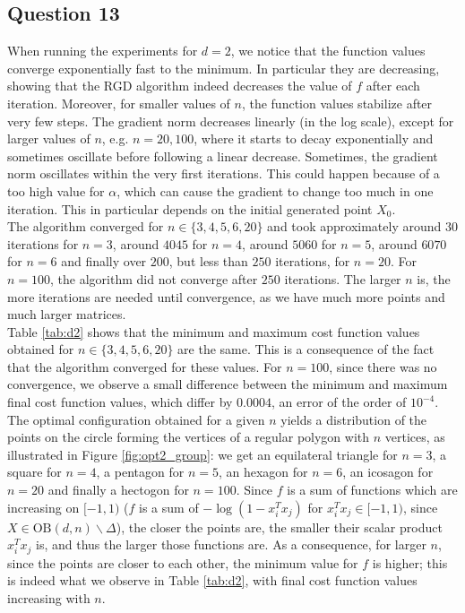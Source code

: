\documentclass{article}
\begin{document}
\subsection*{Question 13}
When running the experiments for $d=2$, we notice that the function values converge exponentially fast to the minimum. In particular they are decreasing, showing that the RGD algorithm indeed decreases the value of $f$ after each iteration. Moreover, for smaller values of $n$, the function values stabilize after very few steps. The gradient norm decreases linearly (in the log scale), except for larger values of $n$, e.g. $n=20, 100$, where it starts to decay exponentially and sometimes oscillate before following a linear decrease. Sometimes, the gradient norm oscillates within the very first iterations. This could happen because of a too high value for $\alpha$, which can cause the gradient to change too much in one iteration. This in particular depends on the initial generated point $X_0$.\\
The algorithm converged for $n\in\{3, 4, 5, 6, 20\}$ and took approximately around $30$ iterations for $n=3$, around $40$\textendash$45$ for $n=4$, around $50$\textendash$60$ for $n=5$, around $60$\textendash$70$ for $n=6$ and finally over $200$, but less than $250$ iterations, for $n=20$. For $n=100$, the algorithm did not converge after $250$ iterations. The larger $n$ is, the more iterations are needed until convergence, as we have much more points and much larger matrices.\\
Table \ref{tab:d2} shows that the minimum and maximum cost function values obtained for $n\in\{3, 4, 5, 6, 20\}$ are the same. This is a consequence of the fact that the algorithm converged for these values. For $n=100$, since there was no convergence, we observe a small difference between the minimum and maximum final cost function values, which differ by $0.0004$, an error of the order of $10^{-4}$.\\
The optimal configuration obtained for a given $n$ yields a distribution of the points on the circle forming the vertices of a regular polygon with $n$ vertices, as illustrated in Figure \ref{fig:opt2_group}: we get an equilateral triangle for $n=3$, a square for $n=4$, a pentagon for $n=5$, an hexagon for $n=6$, an icosagon for $n=20$ and finally a hectogon for $n=100$. Since $f$ is a sum of functions which are increasing on $[-1, 1)$ ($f$ is a sum of $-\log(1-x_i^Tx_j)$ for $x_i^Tx_j\in [-1, 1)$, since $X\in\text{OB}(d, n)\backslash\Delta$), the closer the points are, the smaller their scalar product $x_i^Tx_j$ is, and thus the larger those functions are. As a consequence, for larger $n$, since the points are closer to each other, the minimum value for $f$ is higher; this is indeed what we observe in Table \ref{tab:d2}, with final cost function values increasing with $n$.
\end{document}
